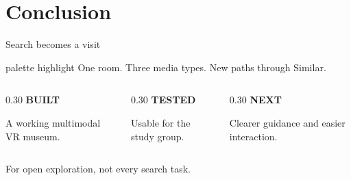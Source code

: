 \section{Conclusion}
\begin{frame}[c]{Search becomes a visit}
\begin{beamercolorbox}[sep=0.9em,rounded=true]{palette highlight}
\centering\Large One room. Three media types. New paths through Similar.
\end{beamercolorbox}
\vspace{0.55cm}
\begin{columns}[T,onlytextwidth]
\begin{column}{0.30\textwidth}
\textcolor{unired}{\large\bfseries BUILT}

\vspace{0.15cm}
A working multimodal VR museum.
\end{column}
\begin{column}{0.30\textwidth}
\textcolor{unired}{\large\bfseries TESTED}

\vspace{0.15cm}
Usable for the study group.
\end{column}
\begin{column}{0.30\textwidth}
\textcolor{unired}{\large\bfseries NEXT}

\vspace{0.15cm}
Clearer guidance and easier interaction.
\end{column}
\end{columns}
\vspace{0.45cm}
\centering\small For open exploration, not every search task.
\end{frame}
